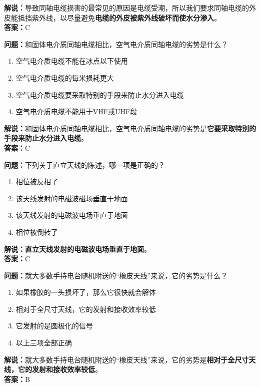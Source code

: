 \textbf{解说：}导致同轴电缆损害的最常见的原因是电缆受潮，所以我们要求同轴电缆的外皮能抵挡紫外线，以尽量避免\textbf{电缆的外皮被紫外线破坏而使水分渗入}。\\\textbf{答案：}C%



\textbf{问题：}和固体电介质同轴电缆相比，空气电介质同轴电缆的劣势是什么？

\begin{enumerate}[label=\Alph*), leftmargin=1.5cm]
	\item 空气电介质电缆不能在冰点以下使用
	\item 空气电介质电缆的每米损耗更大
	\item 空气电介质电缆要采取特别的手段来防止水分进入电缆
	\item 空气电介质电缆不能用于VHF或UHF段
\end{enumerate}

\textbf{解说：}和固体电介质同轴电缆相比，空气电介质同轴电缆的劣势是\textbf{它要采取特别的手段来防止水分进入电缆}。\\\textbf{答案：}C%



\textbf{问题：}下列关于直立天线的陈述，哪一项是正确的？

\begin{enumerate}[label=\Alph*), leftmargin=1.5cm]
	\item 相位被反相了
	\item 该天线发射的电磁波磁场垂直于地面
	\item 该天线发射的电磁波电场垂直于地面
	\item 相位被倒转了
\end{enumerate}

\textbf{解说：}\textbf{直立天线发射的电磁波电场垂直于地面}。\\\textbf{答案：}C



\textbf{问题：}就大多数手持电台随机附送的“橡皮天线”来说，它的劣势是什么？

\begin{enumerate}[label=\Alph*), leftmargin=1.5cm]
	\item 如果橡胶的一头损坏了，那么它很快就会解体
	\item 相对于全尺寸天线，它的发射和接收效率较低
	\item 它发射的是圆极化的信号
	\item 以上三项全部正确
\end{enumerate}

\textbf{解说：}就大多数手持电台随机附送的“橡皮天线”来说，它的劣势是\textbf{相对于全尺寸天线，它的发射和接收效率较低}。\\\textbf{答案：}B



